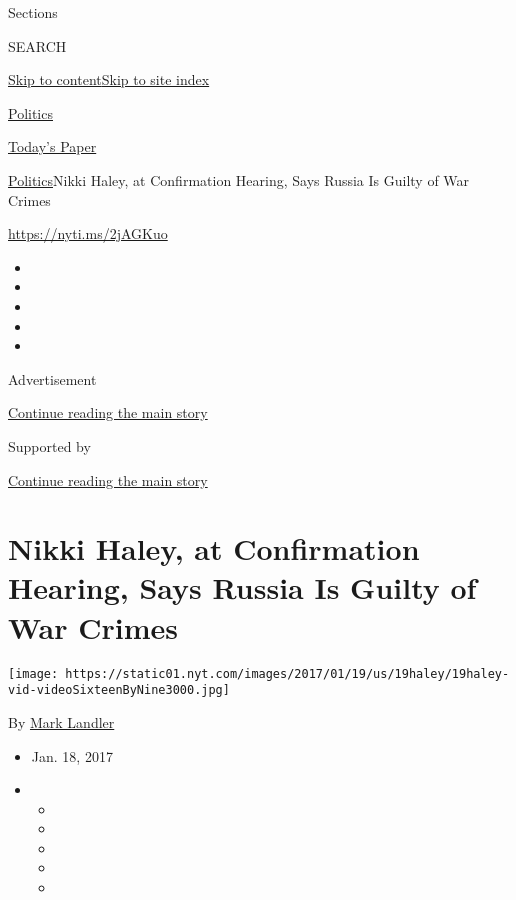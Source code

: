 Sections

SEARCH

\protect\hyperlink{site-content}{Skip to
content}\protect\hyperlink{site-index}{Skip to site index}

\href{https://www.nytimes.com/section/politics}{Politics}

\href{https://myaccount.nytimes.com/auth/login?response_type=cookie\&client_id=vi}{}

\href{https://www.nytimes.com/section/todayspaper}{Today's Paper}

\href{/section/politics}{Politics}\textbar{}Nikki Haley, at Confirmation
Hearing, Says Russia Is Guilty of War Crimes

\url{https://nyti.ms/2jAGKuo}

\begin{itemize}
\item
\item
\item
\item
\item
\end{itemize}

Advertisement

\protect\hyperlink{after-top}{Continue reading the main story}

Supported by

\protect\hyperlink{after-sponsor}{Continue reading the main story}

\hypertarget{nikki-haley-at-confirmation-hearing-says-russia-is-guilty-of-war-crimes}{%
\section{Nikki Haley, at Confirmation Hearing, Says Russia Is Guilty of
War
Crimes}\label{nikki-haley-at-confirmation-hearing-says-russia-is-guilty-of-war-crimes}}

\texttt{[image: https://static01.nyt.com/images/2017/01/19/us/19haley/19haley-vid-videoSixteenByNine3000.jpg]}

By \href{http://www.nytimes.com/by/mark-landler}{Mark Landler}

\begin{itemize}
\item
  Jan. 18, 2017
\item
  \begin{itemize}
  \item
  \item
  \item
  \item
  \item
  \end{itemize}
\end{itemize}

